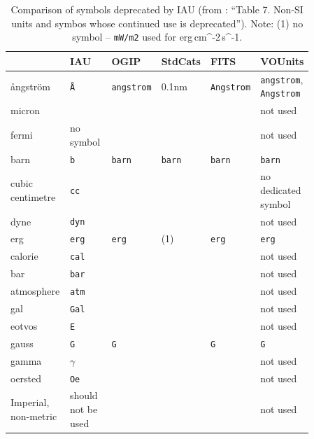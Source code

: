 \documentclass[11pt,notitlepage,onecolumn]{ivoa}
\makeatletter
\def\units{\@ifstar{\let\un@tsspace\relax    \un@ts}%
                   {\let\un@tsspace\thinspace\un@ts}}
\newcommand{\un@ts}[1]{{\let~\thinspace
  \ifmmode
    \un@tsspace\mathrm{#1}%
  \else
    \nobreak$\un@tsspace\mathrm{#1}$%
  \fi}}
\newcommand{\unit}[1]{\texttt{\small\color{orange}#1}}
\def\micro{{\ensuremath \mu}}
\makeatother
\begin{document}
\begin{table}[ht]
\begin{tabular}{|L{0.2\linewidth}|L{0.15\linewidth}|L{0.12\linewidth}|L{0.12\linewidth}|L{0.12\linewidth}|L{0.15\linewidth}|}
\hline
    & IAU & OGIP  & StdCats & FITS  & VOUnits\\\hline
    \aa{}ngstr\"om & \unit{\AA} & \unit{angstrom} & 0.1nm & \unit{Angstrom} & \unit{angstrom}, \unit{Angstrom}\\\hline
    micron & \unit{\micro} &  &  &  & not used \\\hline
    fermi & no symbol &  &  &  & not used \\\hline
    barn & \unit{b} & \unit{barn} & \unit{barn} & \unit{barn} & \unit{barn}\\\hline
    cubic centimetre & \unit{cc} &  &  &  & no dedicated symbol\\\hline
    dyne & \unit{dyn} & \unit{} & \unit{} & \unit{} & not used \\\hline
    erg & \unit{erg} & \unit{erg} & (1) & \unit{erg} & \unit{erg} \\\hline
    calorie & \unit{cal} & \unit{} & \unit{} & \unit{} & not used \\\hline
    bar & \unit{bar} & \unit{} & \unit{} & \unit{} & not used \\\hline
    atmosphere & \unit{atm} & \unit{} & \unit{} & \unit{} & not used \\\hline
    gal & \unit{Gal} & \unit{} & \unit{} & \unit{} & not used \\\hline
    eotvos & \unit{E} & \unit{} & \unit{} & \unit{} & not used \\\hline
    gauss & \unit{G} & \unit{G} & \unit{} & \unit{G} & \unit{G} \\\hline
    gamma & \unit{$\gamma$} & \unit{} & \unit{} & \unit{} & not used \\\hline
    oersted & \unit{Oe} & \unit{} & \unit{} & \unit{} & not used \\\hline
    Imperial, non-metric & should not be used & \unit{} & \unit{} & \unit{} & not used \\\hline
\end{tabular}
  \caption[Comparison of symbols deprecated by IAU]{Comparison of
  symbols deprecated by IAU (from \citet{wilkins89}: ``Table 7. Non-SI
  units and symbos whose continued use is deprecated'').
  Note: (1) no symbol -- \unit{mW/m2} used for \units{erg\,cm^{-2}\,s^{-1}}.}
  \label{tabx:comparUnitDeprecated}
\end{table}
\end{document}
